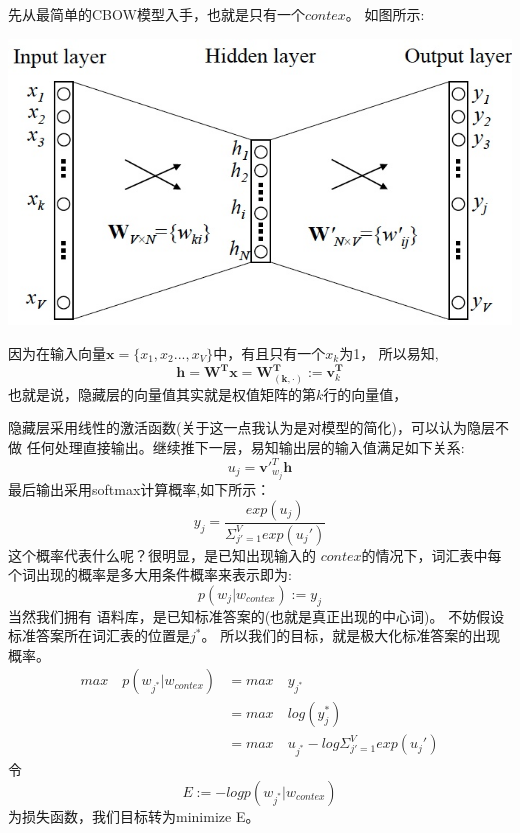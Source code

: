 \documentclass{article}
\begin{document}
        先从最简单的CBOW模型入手，也就是只有一个$contex$。
        如图所示:
        \begin{center}
            \includegraphics[scale=0.4]{1.jpg}
        \end{center}
        
        因为在输入向量$\mathbf{x}=\{x_1,x_2...,x_V\}$中，有且只有一个$x_k$为1，
        所以易知,
        \begin{equation}
            \mathbf{h} = \mathbf{W^{T}x} = \mathbf{W_{(k,·)}^{T}} := \mathbf{v}_{k}^\mathbf{T}
        \end{equation}
        也就是说，隐藏层的向量值其实就是权值矩阵的第$k$行的向量值，

        隐藏层采用线性的激活函数(关于这一点我认为是对模型的简化)，可以认为隐层不做
        任何处理直接输出。继续推下一层，易知输出层的输入值满足如下关系:
        \begin{equation}
            u_j = \mathbf{v}'^{T}_{w_j}\mathbf{h}
        \end{equation}
        最后输出采用softmax计算概率,如下所示：
        \begin{equation}
            y_j = \frac{exp(u_j)}{\Sigma_{j'=1}^{V}exp(u_j')}
        \end{equation}
        这个概率代表什么呢？很明显，是已知出现输入的
        $contex$的情况下，词汇表中每个词出现的概率是多大用条件概率来表示即为:
        \[ p(w_j|w_{contex}) := y_j\]
        当然我们拥有
        语料库，是已知标准答案的(也就是真正出现的中心词)。
        不妨假设标准答案所在词汇表的位置是$j^*$。
        所以我们的目标，就是极大化标准答案的出现概率。
        \begin{equation}
            \begin{split}
                max\quad p(w_{j^*}|w_{contex}) &= max\quad y_{j^*} \\
                                         &= max\quad log(y_j^*) \\
                                         &= max\quad u_{j^*} - log \Sigma_{j'=1}^{V}exp(u_j')
            \end{split}
        \end{equation}
        令
        \begin{equation}
            E := -log p(w_{j^*}|w_{contex}) 
        \end{equation}
        为损失函数，我们目标转为minimize E。
\end{document}
